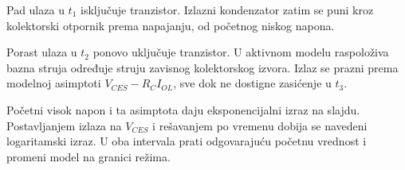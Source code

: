 Pad ulaza u $t_1$ isključuje tranzistor. Izlazni kondenzator zatim se puni kroz kolektorski otpornik prema napajanju, od početnog niskog napona.

Porast ulaza u $t_2$ ponovo uključuje tranzistor. U aktivnom modelu raspoloživa bazna struja određuje struju zavisnog kolektorskog izvora. Izlaz se prazni prema modelnoj asimptoti $V_{CES}-R_CI_{OL}$, sve dok ne dostigne zasićenje u $t_3$.

Početni visok napon i ta asimptota daju eksponencijalni izraz na slajdu. Postavljanjem izlaza na $V_{CES}$ i rešavanjem po vremenu dobija se navedeni logaritamski izraz. U oba intervala prati odgovarajuću početnu vrednost i promeni model na granici režima.
